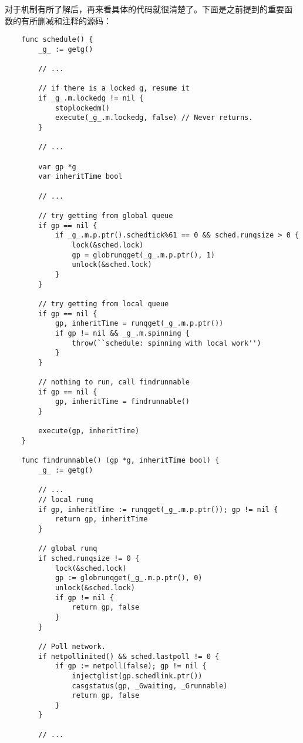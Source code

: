 \documentclass[UTF8,b5paper,fontset=adobe]{ctexart}
\begin{document}
对于机制有所了解后，再来看具体的代码就很清楚了。下面是之前提到的重要函
数的有所删减和注释的源码：

\begin{verbatim}
    func schedule() {
        _g_ := getg()

        // ...

        // if there is a locked g, resume it    
        if _g_.m.lockedg != nil {
            stoplockedm()
            execute(_g_.m.lockedg, false) // Never returns.
        }

        // ...

        var gp *g
        var inheritTime bool

        // ...

        // try getting from global queue
        if gp == nil {
            if _g_.m.p.ptr().schedtick%61 == 0 && sched.runqsize > 0 {
                lock(&sched.lock)
                gp = globrunqget(_g_.m.p.ptr(), 1)
                unlock(&sched.lock)
            }
        }

        // try getting from local queue
        if gp == nil {
            gp, inheritTime = runqget(_g_.m.p.ptr())
            if gp != nil && _g_.m.spinning {
                throw(``schedule: spinning with local work'')
            }
        }
    
        // nothing to run, call findrunnable
        if gp == nil {
            gp, inheritTime = findrunnable()
        }
        
        execute(gp, inheritTime)
    }

    func findrunnable() (gp *g, inheritTime bool) {
        _g_ := getg()

        // ...
        // local runq
        if gp, inheritTime := runqget(_g_.m.p.ptr()); gp != nil {
            return gp, inheritTime
        }

        // global runq
        if sched.runqsize != 0 {
            lock(&sched.lock)
            gp := globrunqget(_g_.m.p.ptr(), 0)
            unlock(&sched.lock)
            if gp != nil {
                return gp, false
            }
        }

        // Poll network.
        if netpollinited() && sched.lastpoll != 0 {
            if gp := netpoll(false); gp != nil {
                injectglist(gp.schedlink.ptr())
                casgstatus(gp, _Gwaiting, _Grunnable)
                return gp, false
            }
        }
        
        // ...
        

\end{verbatim}
\end{document}
